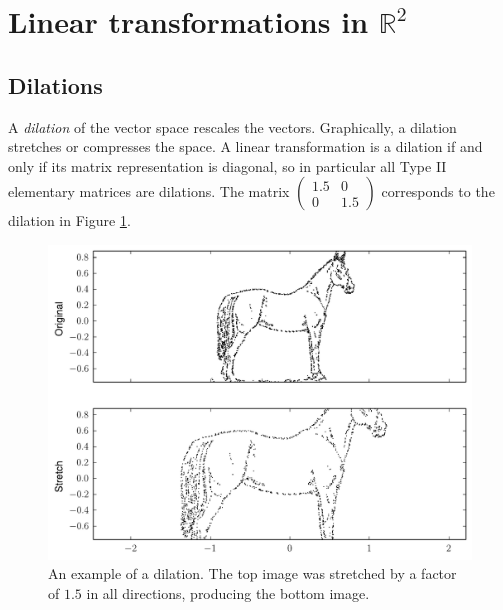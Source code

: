 \label{lab:ChangeBasis}

\section*{Linear transformations in $\mathbb{R}^2$}
\subsection*{Dilations}
A \emph{dilation} of the vector space rescales the vectors. 
Graphically, a dilation stretches or compresses the space. 
A linear transformation is a dilation if and only if its matrix representation is diagonal, so in particular all Type II elementary matrices are dilations. 
The matrix $\begin{pmatrix}
1.5 & 0\\
0 & 1.5 \end{pmatrix}$ corresponds to the dilation in Figure \ref{fig:dilation}.
\begin{figure}
\includegraphics[width=\textwidth]{stretch.pdf}
\caption{An example of a dilation. 
The top image was stretched by a factor of $1.5$ in all directions, producing the bottom image.}
\label{fig:dilation}
\end{figure}

